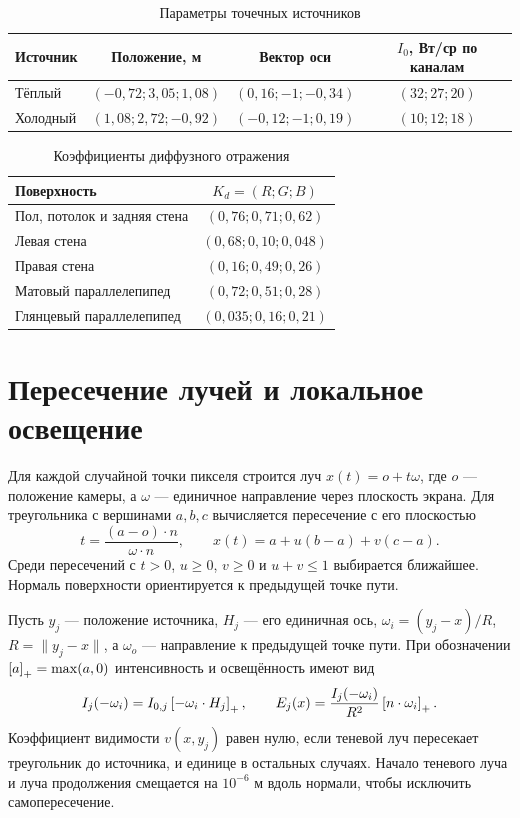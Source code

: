 \begin{table}[ht]
\centering
\caption{Параметры точечных источников}
\begin{tabular}{lccc}
\toprule
Источник & Положение, м & Вектор оси & \(I_0\), Вт/ср по каналам \\
\midrule
Тёплый & \((-0{,}72;3{,}05;1{,}08)\) & \((0{,}16;-1;-0{,}34)\) & \((32;27;20)\) \\
Холодный & \((1{,}08;2{,}72;-0{,}92)\) & \((-0{,}12;-1;0{,}19)\) & \((10;12;18)\) \\
\bottomrule
\end{tabular}
\end{table}

\begin{table}[ht]
\centering
\caption{Коэффициенты диффузного отражения}
\begin{tabular}{lc}
\toprule
Поверхность & \(K_d=(R;G;B)\) \\
\midrule
Пол, потолок и задняя стена & \((0{,}76;0{,}71;0{,}62)\) \\
Левая стена & \((0{,}68;0{,}10;0{,}048)\) \\
Правая стена & \((0{,}16;0{,}49;0{,}26)\) \\
Матовый параллелепипед & \((0{,}72;0{,}51;0{,}28)\) \\
Глянцевый параллелепипед & \((0{,}035;0{,}16;0{,}21)\) \\
\bottomrule
\end{tabular}
\end{table}

\clearpage
\section{Пересечение лучей и локальное освещение}

Для каждой случайной точки пикселя строится луч \(x(t)=o+t\omega\), где \(o\) ---
положение камеры, а \(\omega\) --- единичное направление через плоскость экрана.
Для треугольника с вершинами \(a,b,c\) вычисляется пересечение с его плоскостью
\[
 t=\frac{(a-o)\cdot n}{\omega\cdot n},
 \qquad x(t)=a+u(b-a)+v(c-a).
\]
Среди пересечений с \(t>0\), \(u\ge0\), \(v\ge0\) и \(u+v\le1\) выбирается
ближайшее. Нормаль поверхности ориентируется к предыдущей точке пути.

Пусть \(y_j\) --- положение источника, \(H_j\) --- его единичная ось,
\(\omega_i=(y_j-x)/R\), \(R=\lVert y_j-x\rVert\), а
\(\omega_o\) --- направление к предыдущей точке пути. При обозначении
\(\left[a\right]_+=\max(a,0)\) интенсивность и освещённость имеют вид
\[
 I_j(-\omega_i)=I_{0,j}\left[-\omega_i\cdot H_j\right]_+,\qquad
 E_j(x)=\frac{I_j(-\omega_i)}{R^2}\left[n\cdot\omega_i\right]_+.
\]
Коэффициент видимости \(v(x,y_j)\) равен нулю, если теневой луч пересекает
треугольник до источника, и единице в остальных случаях. Начало теневого
луча и луча продолжения смещается на \(10^{-6}\) м вдоль нормали, чтобы
исключить самопересечение.

